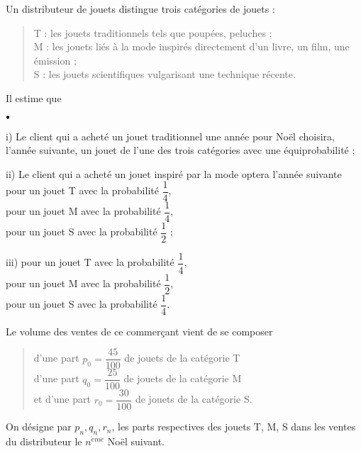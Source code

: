 \documentclass[11pt]{article}%
\begin{document}
Un distributeur de jouets distingue trois catégories de jouets :

\begin{quote}
\noindent T : les jouets traditionnels tels que poupées, peluches ;\\
M : les jouets liés à la mode inspirés directement d'un livre, un film,
une émission ;\\
S : les jouets scientifiques vulgarisant une technique récente.
\end{quote}

\noindent Il estime que

\begin{noliste}{$\scriptstyle \bullet$}
\item[i)] Le client qui a acheté un jouet traditionnel une année pour
Noël
choisira, l'année suivante, un jouet de l'une des trois catégories avec
une équiprobabilité ;

\item[ii)] Le client qui a acheté un jouet inspiré par la mode optera
l'année suivante \\
pour un jouet T avec la probabilité $\dfrac{1}{4}$,\\
pour un jouet M avec la probabilité $\dfrac{1}{4}$,\\
pour un jouet S avec la probabilité $\dfrac{1}{2}$ ;

\item[iii)] pour un jouet T avec la probabilité $\dfrac{1}{4}$,\\
pour un jouet M avec la probabilité $\dfrac{1}{2}$,\\
pour un jouet S avec la probabilité $\dfrac{1}{4}$.
\end{noliste}

\noindent Le volume des ventes de ce commerçant vient de se composer

\begin{quote}
\noindent d'une part $p_{0} = \dfrac{45}{100}$ de jouets de la
catégorie T\\
d'une part $q_{0} = \dfrac{25}{100}$ de jouets de la catégorie M\\
et d'une part $r_{0} = \dfrac{30}{100}$ de jouets de la catégorie S.
\end{quote}

\noindent On désigne par $p_{n},q_{n},r_{n}$, les parts respectives des
jouets T, M, S dans les ventes du distributeur le $n^{\grave{e}me}$
Noël
suivant.
\end{document}
